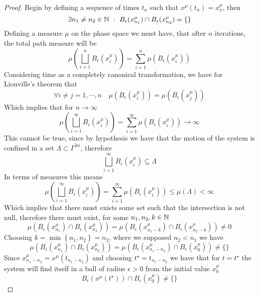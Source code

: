 \documentclass[../admech.tex]{subfiles}
\begin{document}
\begin{proof}
	Begin by defining a sequence of times $t_n$ such that $x^\mu(t_n)=x^\mu_n$, then
	\begin{equation*}
		\exists n_1\ne n_2\in\N\ :\ B_\epsilon(x^\mu_{n_1})\cap B_\epsilon(x^\mu_{n_2})=\{\}
	\end{equation*}
	Defining a measure $\mu$ on the phase space we must have, that after $n$ iterations, the total path measure will be
	\begin{equation*}
		\mu\left( \bigsqcup_{i=1}^nB_\epsilon(x^\mu_i) \right)=\sum_{i=1}^n\mu\left( B_\epsilon(x^\mu_i) \right)
	\end{equation*}
	Considering time as a completely canonical transformation, we have for Liouville's theorem that
	\begin{equation*}
		\forall i\ne j=1,\cdots,n\quad\mu\left( B_\epsilon(x^\mu_i) \right)=\mu\left( B_\epsilon(x^\mu_j) \right)
	\end{equation*}
	Which implies that for $n\to\infty$
	\begin{equation*}
		\mu\left( \bigsqcup_{i=1}^\infty B_\epsilon(x^\mu_i) \right)=\sum_{i=1}^\infty\mu\left(B_\epsilon(x^\mu_i)\right)\to\infty
	\end{equation*}
	This cannot be true, since by hypothesis we have that the motion of the system is confined in a set $\Lambda\subset\Gamma^{2n}$, therefore
	\begin{equation*}
		\bigsqcup_{i=1}^\infty B_\epsilon(x^\mu_i)\subseteq\Lambda
	\end{equation*}
	In terms of measures this means
	\begin{equation*}
		\mu\left( \bigsqcup_{i=1}^\infty B_\epsilon(x^\mu_i) \right)=\sum_{i=1}^\infty\mu\left( B_\epsilon(x^\mu_i) \right)\le\mu\left( \Lambda \right)<\infty
	\end{equation*}
	Which implies that there must exists some set such that the intersection is not null, therefore there must exist, for some $n_1,n_2,k\in\operatorname{\mathbb{N}}$
	\begin{equation*}
		\mu\left( B_\epsilon(x^\mu_{n_1})\cap B_\epsilon(x^\mu_{n_2}) \right)=\mu\left( B_\epsilon(x^\mu_{n_1-k})\cap B_\epsilon(x^\mu_{n_2-k}) \right)\ne 0
	\end{equation*}
	Choosing $k=\min\left\{  n_1,n_2\right\}=n_2$, where we supposed $n_2<n_1$ we have
	\begin{equation*}
		\mu\left( B_\epsilon(x^\mu_{n_1})\cap B_\epsilon(x^\mu_{n_2}) \right)=\mu\left( B_{\epsilon}(x^\mu_{n_1-n_2})\cap B_\epsilon(x^\mu_0) \right)\ne\{\}
	\end{equation*}
	Since $x^\mu_{n_1-n_2}=x^\mu(t_{n_1-n_2})$ and choosing $t^\star=t_{n_1-n_2}$ we have that for $t=t^\star$ the system will find itself in a ball of radius $\epsilon>0$ from the initial value $x_0^\mu$
	\begin{equation*}
		B_\epsilon(x^\mu(t^\star))\cap B_\epsilon(x^\mu_0)\ne\{\}
	\end{equation*}
\end{proof}
\end{document}
